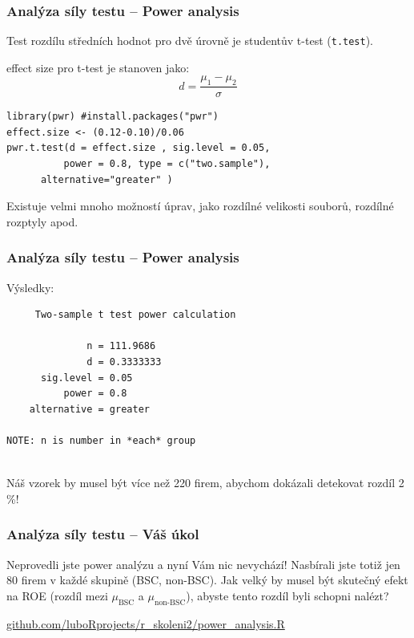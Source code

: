 \documentclass[10pt,xcolor={dvipsnames}]{beamer}
\begin{document}

\begin{frame}[fragile]
\frametitle{Analýza síly testu -- Power analysis}
Test rozdílu středních hodnot pro dvě úrovně je studentův t-test (\texttt{t.test}).\newline\smallskip

effect size pro t-test je stanoven jako: \[d=\frac{\mu_1 - \mu_2}{\sigma}\]

\begin{verbatim}
library(pwr) #install.packages("pwr")
effect.size <- (0.12-0.10)/0.06
pwr.t.test(d = effect.size , sig.level = 0.05, 
	      power = 0.8, type = c("two.sample"),
      alternative="greater" )
\end{verbatim}

Existuje velmi mnoho možností úprav, jako rozdílné velikosti souborů, rozdílné rozptyly apod.
\end{frame}


\begin{frame}[fragile]
\frametitle{Analýza síly testu -- Power analysis}
Výsledky:
\begin{verbatim}
     Two-sample t test power calculation 

              n = 111.9686
              d = 0.3333333
      sig.level = 0.05
          power = 0.8
    alternative = greater

NOTE: n is number in *each* group


\end{verbatim}

\textcolor{WildStrawberry}{Náš vzorek by musel být více než 220 firem, abychom dokázali detekovat rozdíl 2 \%!}

\end{frame}


\begin{frame}[fragile]
\frametitle{Analýza síly testu -- Váš úkol}
\begin{Large}

Neprovedli jste power analýzu a nyní Vám nic nevychází! Nasbírali jste totiž jen 80 firem v každé skupině (BSC, non-BSC). Jak velký by musel být skutečný efekt na ROE (rozdíl mezi $\mu_{\text{BSC}}$ a $\mu_{\text{non-BSC}}$), abyste tento rozdíl byli schopni nalézt?
\end{Large}\newline\smallskip

\url{github.com/luboRprojects/r_skoleni2/power_analysis.R}
\end{frame}
\end{document}
